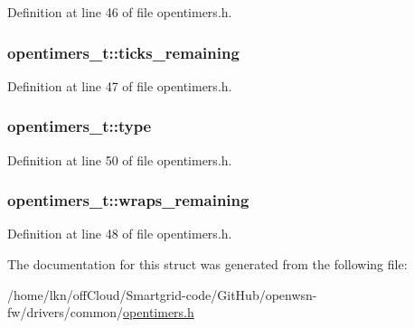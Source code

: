 Definition at line 46 of file opentimers.\+h.

\subsubsection[{\texorpdfstring{ticks\+\_\+remaining}{ticks_remaining}}]{ opentimers\+\_\+t\+::ticks\+\_\+remaining}\hypertarget{structopentimers__t_a9033b4c54424e36c49fcc49a9a6e3380}{}\label{structopentimers__t_a9033b4c54424e36c49fcc49a9a6e3380}


Definition at line 47 of file opentimers.\+h.

\subsubsection[{\texorpdfstring{type}{type}}]{ opentimers\+\_\+t\+::type}\hypertarget{structopentimers__t_afe86687f7300b5ffc9a2249ffd6f3292}{}\label{structopentimers__t_afe86687f7300b5ffc9a2249ffd6f3292}


Definition at line 50 of file opentimers.\+h.

\subsubsection[{\texorpdfstring{wraps\+\_\+remaining}{wraps_remaining}}]{ opentimers\+\_\+t\+::wraps\+\_\+remaining}\hypertarget{structopentimers__t_ad06c9dbce2b6e20eecdd1e47e68547f1}{}\label{structopentimers__t_ad06c9dbce2b6e20eecdd1e47e68547f1}


Definition at line 48 of file opentimers.\+h.



The documentation for this struct was generated from the following file\+:\begin{DoxyCompactItemize}
\item 
/home/lkn/off\+Cloud/\+Smartgrid-\/code/\+Git\+Hub/openwsn-\/fw/drivers/common/\hyperlink{opentimers_8h}{opentimers.\+h}\end{DoxyCompactItemize}
